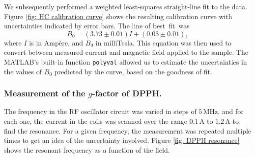 \documentclass[a4paper]{jpconf}
\numberwithin{equation}{section}
\begin{document}
We subsequently performed a weighted least-squares straight-line fit to the data. Figure \ref{fig: HC calibration curve} shows the resulting calibration curve with uncertainties indicated by error bars. The line of best~fit~was 
\[
B_0 = (3.73 \pm 0.01) I + (0.03 \pm 0.01),
\]
where $I$ is in Amp\`ere, and $B_0$ in milliTesla. This equation was then used to convert between measured current and magnetic field applied to the sample. The MATLAB's built-in function \texttt{polyval} allowed us to estimate the uncertainties in the values of $B_0$ predicted by the curve, based on the goodness of fit.


\subsubsection{Measurement of the $g$-factor of DPPH.}
The frequency in the RF oscillator circuit was varied in steps of $5 \, \si{\mega\hertz}$, and for each one, the current in the coils was scanned over the range $0.1 \, \si{\ampere}$ to $1.2 \, \si{\ampere}$ to find the resonance. For a given frequency, the measurement was repeated multiple times to get an idea of the uncertainty involved. Figure \ref{fig: DPPH resonance} shows the resonant frequency as a function of the field.
\end{document}
